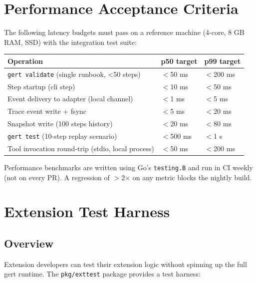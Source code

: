 \section{Performance Acceptance Criteria}

The following latency budgets must pass on a reference machine (4-core, 8 GB RAM, SSD) with the integration test suite:

\begin{center}
\begin{tabular}{lll}
\hline
\textbf{Operation} & \textbf{p50 target} & \textbf{p99 target} \\
\hline
\texttt{gert validate} (single runbook, <50 steps) & $<$50 ms   & $<$200 ms  \\
Step startup (cli step)                              & $<$10 ms   & $<$50 ms   \\
Event delivery to adapter (local channel)            & $<$1 ms    & $<$5 ms    \\
Trace event write + fsync                            & $<$5 ms    & $<$20 ms   \\
Snapshot write (100 steps history)                   & $<$20 ms   & $<$80 ms   \\
\texttt{gert test} (10-step replay scenario)         & $<$500 ms  & $<$1 s     \\
Tool invocation round-trip (stdio, local process)    & $<$50 ms   & $<$200 ms  \\
\hline
\end{tabular}
\end{center}

Performance benchmarks are written using Go's \texttt{testing.B} and run in CI weekly (not on every PR). A regression of $>$2$\times$ on any metric blocks the nightly build.

\section{Extension Test Harness}

\subsection{Overview}

Extension developers can test their extension logic without spinning up the full gert runtime. The \texttt{pkg/exttest} package provides a test harness:


